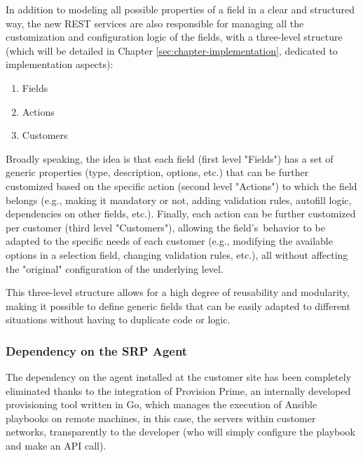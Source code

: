 In addition to modeling all possible properties of a field in a clear and structured way, the new REST services are also responsible for managing all the customization and configuration logic of the fields, with a three-level structure (which will be detailed in Chapter \ref{sec:chapter-implementation}, dedicated to implementation aspects):

\begin{enumerate}
    \item Fields
    \item Actions
    \item Customers
\end{enumerate}

Broadly speaking, the idea is that each field (first level "Fields") has a set of generic properties (type, description, options, etc.) that can be further customized based on the specific action (second level "Actions") to which the field belongs (e.g., making it mandatory or not, adding validation rules, autofill logic, dependencies on other fields, etc.).
Finally, each action can be further customized per customer (third level "Customers"), allowing the field's~behavior to be adapted to the specific needs of each customer (e.g., modifying the available options in a selection field, changing validation rules, etc.), all without affecting the "original" configuration of the underlying level.

This three-level structure allows for a high degree of reusability and modularity, making it possible to define generic fields that can be easily adapted to different situations without having to duplicate code or logic.

\subsubsection{Dependency on the SRP Agent}
The dependency on the agent installed at the customer site has been completely eliminated thanks to the integration of Provision Prime, an internally developed provisioning tool written in Go, which manages the execution of Ansible playbooks on remote machines, in this case, the servers within customer networks, transparently to the developer (who will simply configure the playbook and make an API call).

